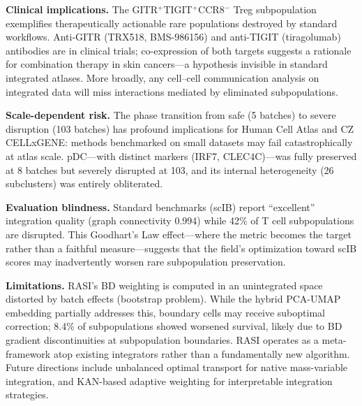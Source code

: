 \documentclass[10pt]{article}
\begin{document}
\textbf{Clinical implications.} The GITR$^+$TIGIT$^+$CCR8$^-$ Treg subpopulation exemplifies therapeutically actionable rare populations destroyed by standard workflows. Anti-GITR (TRX518, BMS-986156) and anti-TIGIT (tiragolumab) antibodies are in clinical trials; co-expression of both targets suggests a rationale for combination therapy in skin cancers---a hypothesis invisible in standard integrated atlases. More broadly, any cell--cell communication analysis on integrated data will miss interactions mediated by eliminated subpopulations.

\textbf{Scale-dependent risk.} The phase transition from safe (5 batches) to severe disruption (103 batches) has profound implications for Human Cell Atlas and CZ CELLxGENE: methods benchmarked on small datasets may fail catastrophically at atlas scale. pDC---with distinct markers (IRF7, CLEC4C)---was fully preserved at 8 batches but severely disrupted at 103, and its internal heterogeneity (26 subclusters) was entirely obliterated.

\textbf{Evaluation blindness.} Standard benchmarks (scIB) report ``excellent'' integration quality (graph connectivity 0.994) while 42\% of T cell subpopulations are disrupted. This Goodhart's Law effect---where the metric becomes the target rather than a faithful measure\cite{strathern1997}---suggests that the field's optimization toward scIB scores may inadvertently worsen rare subpopulation preservation.

\textbf{Limitations.} RASI's BD weighting is computed in an unintegrated space distorted by batch effects (bootstrap problem). While the hybrid PCA-UMAP embedding partially addresses this, boundary cells may receive suboptimal correction; 8.4\% of subpopulations showed worsened survival, likely due to BD gradient discontinuities at subpopulation boundaries. RASI operates as a meta-framework atop existing integrators rather than a fundamentally new algorithm. Future directions include unbalanced optimal transport\cite{chizat2018} for native mass-variable integration, and KAN-based\cite{liu2024} adaptive weighting for interpretable integration strategies.
\end{document}
